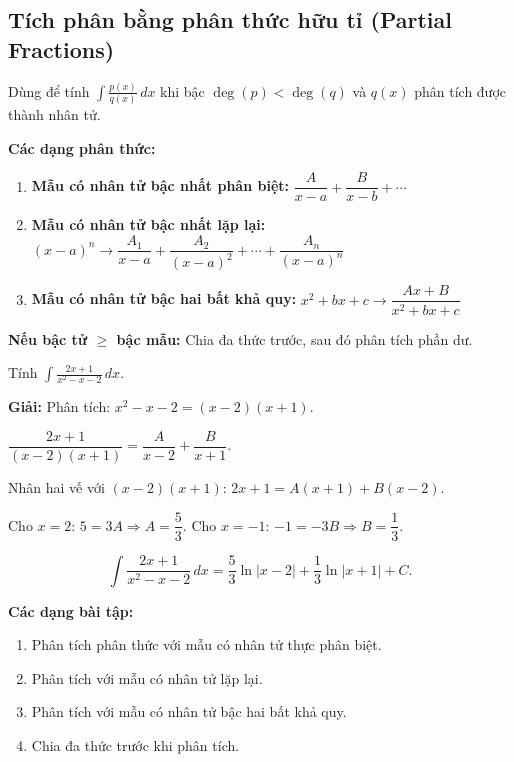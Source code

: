 \documentclass[12pt,a4paper]{article}
\begin{document}
\subsection{Tích phân bằng phân thức hữu tỉ (Partial Fractions)}

\begin{phuongphap}[title={Phân tích thành phân thức hữu tỉ (Partial Fraction Decomposition)}]
  Dùng để tính $\displaystyle\int \frac{p(x)}{q(x)}\,dx$ khi bậc $\deg(p) < \deg(q)$ và $q(x)$ phân tích được thành nhân tử.

  \textbf{Các dạng phân thức:}
  \begin{enumerate}
    \item \textbf{Mẫu có nhân tử bậc nhất phân biệt:} $\dfrac{A}{x-a} + \dfrac{B}{x-b} + \cdots$
    \item \textbf{Mẫu có nhân tử bậc nhất lặp lại:} $(x-a)^n \to \dfrac{A_1}{x-a} + \dfrac{A_2}{(x-a)^2} + \cdots + \dfrac{A_n}{(x-a)^n}$
    \item \textbf{Mẫu có nhân tử bậc hai bất khả quy:} $x^2 + bx + c \to \dfrac{Ax + B}{x^2 + bx + c}$
  \end{enumerate}
  \textbf{Nếu bậc tử $\ge$ bậc mẫu:} Chia đa thức trước, sau đó phân tích phần dư.
\end{phuongphap}

\begin{vidu}
  Tính $\displaystyle\int \frac{2x+1}{x^2 - x - 2}\,dx$.

  \medskip\textbf{Giải:}
  Phân tích: $x^2 - x - 2 = (x-2)(x+1)$.

  $\dfrac{2x+1}{(x-2)(x+1)} = \dfrac{A}{x-2} + \dfrac{B}{x+1}$.

  Nhân hai vế với $(x-2)(x+1)$: $2x+1 = A(x+1) + B(x-2)$.

  Cho $x = 2$: $5 = 3A \Rightarrow A = \dfrac{5}{3}$.
  Cho $x = -1$: $-1 = -3B \Rightarrow B = \dfrac{1}{3}$.

  \[
    \int \frac{2x+1}{x^2-x-2}\,dx = \frac{5}{3}\ln|x-2| + \frac{1}{3}\ln|x+1| + C.
  \]
\end{vidu}

\medskip\noindent\textbf{Các dạng bài tập:}
\begin{enumerate}[label=\textbf{Dạng \arabic*:}, leftmargin=*, align=left]
  \item Phân tích phân thức với mẫu có nhân tử thực phân biệt.
  \item Phân tích với mẫu có nhân tử lặp lại.
  \item Phân tích với mẫu có nhân tử bậc hai bất khả quy.
  \item Chia đa thức trước khi phân tích.
\end{enumerate}
\end{document}
